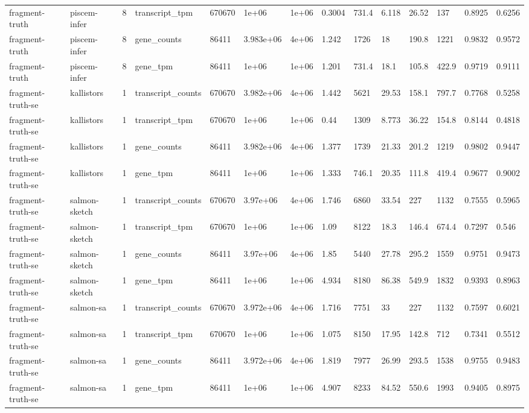 \begin{tabular}{llllllllllllll}
fragment-truth & piscem-infer & 8 & transcript\_tpm & 670670 & 1e+06 & 1e+06 & 0.3004 & 731.4 & 6.118 & 26.52 & 137 & 0.8925 & 0.6256 \\
fragment-truth & piscem-infer & 8 & gene\_counts & 86411 & 3.983e+06 & 4e+06 & 1.242 & 1726 & 18 & 190.8 & 1221 & 0.9832 & 0.9572 \\
fragment-truth & piscem-infer & 8 & gene\_tpm & 86411 & 1e+06 & 1e+06 & 1.201 & 731.4 & 18.1 & 105.8 & 422.9 & 0.9719 & 0.9111 \\
fragment-truth-se & kallistors & 1 & transcript\_counts & 670670 & 3.982e+06 & 4e+06 & 1.442 & 5621 & 29.53 & 158.1 & 797.7 & 0.7768 & 0.5258 \\
fragment-truth-se & kallistors & 1 & transcript\_tpm & 670670 & 1e+06 & 1e+06 & 0.44 & 1309 & 8.773 & 36.22 & 154.8 & 0.8144 & 0.4818 \\
fragment-truth-se & kallistors & 1 & gene\_counts & 86411 & 3.982e+06 & 4e+06 & 1.377 & 1739 & 21.33 & 201.2 & 1219 & 0.9802 & 0.9447 \\
fragment-truth-se & kallistors & 1 & gene\_tpm & 86411 & 1e+06 & 1e+06 & 1.333 & 746.1 & 20.35 & 111.8 & 419.4 & 0.9677 & 0.9002 \\
fragment-truth-se & salmon-sketch & 1 & transcript\_counts & 670670 & 3.97e+06 & 4e+06 & 1.746 & 6860 & 33.54 & 227 & 1132 & 0.7555 & 0.5965 \\
fragment-truth-se & salmon-sketch & 1 & transcript\_tpm & 670670 & 1e+06 & 1e+06 & 1.09 & 8122 & 18.3 & 146.4 & 674.4 & 0.7297 & 0.546 \\
fragment-truth-se & salmon-sketch & 1 & gene\_counts & 86411 & 3.97e+06 & 4e+06 & 1.85 & 5440 & 27.78 & 295.2 & 1559 & 0.9751 & 0.9473 \\
fragment-truth-se & salmon-sketch & 1 & gene\_tpm & 86411 & 1e+06 & 1e+06 & 4.934 & 8180 & 86.38 & 549.9 & 1832 & 0.9393 & 0.8963 \\
fragment-truth-se & salmon-sa & 1 & transcript\_counts & 670670 & 3.972e+06 & 4e+06 & 1.716 & 7751 & 33 & 227 & 1132 & 0.7597 & 0.6021 \\
fragment-truth-se & salmon-sa & 1 & transcript\_tpm & 670670 & 1e+06 & 1e+06 & 1.075 & 8150 & 17.95 & 142.8 & 712 & 0.7341 & 0.5512 \\
fragment-truth-se & salmon-sa & 1 & gene\_counts & 86411 & 3.972e+06 & 4e+06 & 1.819 & 7977 & 26.99 & 293.5 & 1538 & 0.9755 & 0.9483 \\
fragment-truth-se & salmon-sa & 1 & gene\_tpm & 86411 & 1e+06 & 1e+06 & 4.907 & 8233 & 84.52 & 550.6 & 1993 & 0.9405 & 0.8975 \\

\end{tabular}
